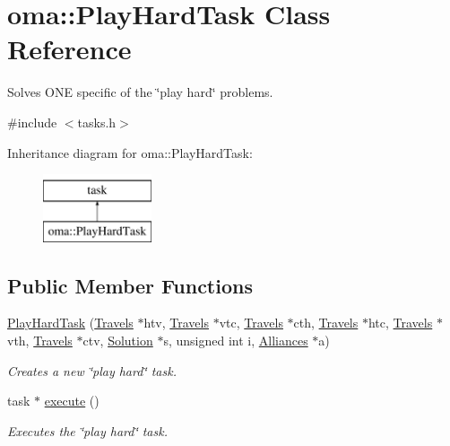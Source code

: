 \hypertarget{classoma_1_1_play_hard_task}{\section{oma\-:\-:Play\-Hard\-Task Class Reference}
\label{classoma_1_1_play_hard_task}
}


Solves O\-N\-E specific of the \char`\"{}play hard\char`\"{} problems.  




{\ttfamily \#include $<$tasks.\-h$>$}

Inheritance diagram for oma\-:\-:Play\-Hard\-Task\-:\begin{figure}[H]
\begin{center}
\leavevmode
\includegraphics[height=2.000000cm]{classoma_1_1_play_hard_task}
\end{center}
\end{figure}
\subsection*{Public Member Functions}
\begin{DoxyCompactItemize}
\item 
\hyperlink{classoma_1_1_play_hard_task_a912956e3a6970a076a38391b3974505f}{Play\-Hard\-Task} (\hyperlink{types_8h_aef021ba284c03a12dddcfa082468e831}{Travels} $\ast$htv, \hyperlink{types_8h_aef021ba284c03a12dddcfa082468e831}{Travels} $\ast$vtc, \hyperlink{types_8h_aef021ba284c03a12dddcfa082468e831}{Travels} $\ast$cth, \hyperlink{types_8h_aef021ba284c03a12dddcfa082468e831}{Travels} $\ast$htc, \hyperlink{types_8h_aef021ba284c03a12dddcfa082468e831}{Travels} $\ast$vth, \hyperlink{types_8h_aef021ba284c03a12dddcfa082468e831}{Travels} $\ast$ctv, \hyperlink{class_solution}{Solution} $\ast$s, unsigned int i, \hyperlink{types_8h_a942cbcc40778424afe78605ae5c364c0}{Alliances} $\ast$a)
\begin{DoxyCompactList}\small\item\em Creates a new \char`\"{}play hard\char`\"{} task. \end{DoxyCompactList}\item 
task $\ast$ \hyperlink{classoma_1_1_play_hard_task_a2ddef4616b383a87f91ddcacd9155d81}{execute} ()
\begin{DoxyCompactList}\small\item\em Executes the \char`\"{}play hard\char`\"{} task. \end{DoxyCompactList}\end{DoxyCompactItemize}


